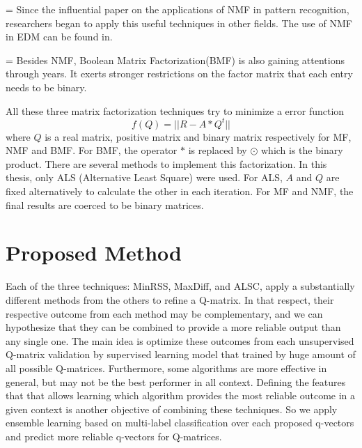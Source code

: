 \documentclass[11pt]{article}
\begin{document}
\parskip = \baselineskip
Since the influential paper on the applications of NMF in pattern  recognition\cite{lee1999learning}, researchers began to apply this useful techniques in other fields. The use of NMF in EDM can be found in\cite{desmarais2012mapping}.

\parskip = \baselineskip
Besides NMF, Boolean Matrix Factorization(BMF) is also gaining attentions through years. It exerts stronger restrictions on the factor matrix that each entry needs to be binary.

All these three matrix factorization techniques try to minimize a error function
$$ f(Q)=||R-A*Q^t||$$
where $Q$ is a real matrix, positive matrix and binary matrix respectively for MF, NMF and BMF. For BMF, the operator $*$ is replaced by $\odot$ which is the binary product. There are several methods to implement this factorization. In this thesis, only ALS (Alternative Least Square) were used. For ALS, $A$ and $Q$ are fixed alternatively to calculate the other in each iteration. For MF and NMF, the final results are coerced to be binary matrices. 




\section{Proposed Method}

 Each of the three techniques: MinRSS, MaxDiff, and ALSC, apply a substantially different methods from the others to refine a Q-matrix. In that respect, their respective outcome from each method may be complementary, and we can hypothesize that they can be combined to provide a more reliable output than any single one. The main idea is optimize these outcomes from each unsupervised Q-matrix validation by supervised learning model that trained by huge amount of all possible Q-matrices. Furthermore, some algorithms are more effective in general, but may not be the best performer in all context.  Defining the features that that allows learning which algorithm provides the most reliable outcome in a given context is another objective of combining these techniques. So we apply ensemble learning based on multi-label classification over each proposed q-vectors and predict more reliable q-vectors for Q-matrices. 
 
\end{document}
